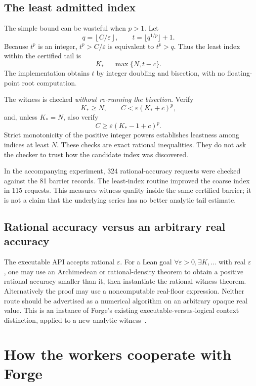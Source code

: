 \documentclass[11pt,a4paper]{article}
\theoremstyle{definition}\newtheorem{definition}[theorem]{Definition}
\begin{document}
\subsection{The least admitted index}

The simple bound can be wasteful when $p>1$. Let
\[
 q=\left\lfloor C/\varepsilon\right\rfloor,
 \qquad t=\lfloor q^{1/p}\rfloor+1.
\]
Because $t^p$ is an integer, $t^p>C/\varepsilon$ is equivalent to $t^p>q$.
Thus the least index within the certified tail is
\begin{equation}\label{eq:leastmodulus}
 K_* = \max\{N,t-c\}.
\end{equation}
The implementation obtains $t$ by integer doubling and bisection, with no
floating-point root computation.

The witness is checked \emph{without re-running the bisection}. Verify
\[
 K_*\ge N,\qquad C<\varepsilon(K_*+c)^p,
\]
and, unless $K_*=N$, also verify
\[
 C\ge\varepsilon(K_*-1+c)^p.
\]
Strict monotonicity of the positive integer powers establishes leastness among
indices at least $N$. These checks are exact rational inequalities. They do
not ask the checker to trust how the candidate index was discovered.

In the accompanying experiment, 324 rational-accuracy requests were checked
against the 81 barrier records. The least-index routine improved the coarse
index in 115 requests. This measures witness quality inside the same certified
barrier; it is not a claim that the underlying series has no better analytic
tail estimate.

\subsection{Rational accuracy versus an arbitrary real accuracy}

The executable API accepts rational $\varepsilon$. For a Lean goal
$\forall\varepsilon>0,\exists K,\ldots$ with real $\varepsilon$, one may
use an Archimedean or rational-density theorem to obtain a positive rational
accuracy smaller than it, then instantiate the rational witness theorem.
Alternatively the proof may use a noncomputable real-floor expression. Neither
route should be advertised as a numerical algorithm on an arbitrary opaque
real value. This is an instance of Forge's existing executable-versus-logical
context distinction, applied to a new analytic witness~\cite{forge-ledger}.

\section{How the workers cooperate with Forge}
\label{sec:cooperation}
\end{document}
